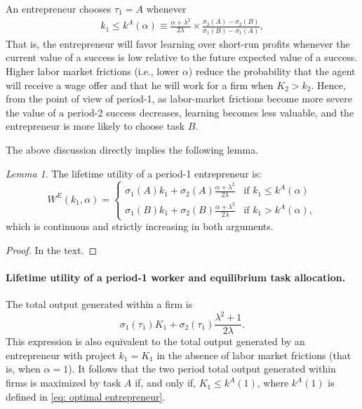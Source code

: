 \documentclass[12pt,american]{paper}
\theoremstyle{remark}
\newtheorem{lemma}{Lemma}
\begin{document}
An entrepreneur chooses $\tau_1=A$ whenever
\begin{align}\label{eq: optimal entrepreneur}
k_1\leq k^A(\alpha) \equiv   \frac{\alpha+\lambda^2}{2\lambda}\times\frac{\sigma_2(A)-\sigma_2(B)}{\sigma_1(B)-\sigma_1(A)},
\end{align}
That is, the entrepreneur will favor learning over short-run profits whenever the current value of a success is low relative to the future expected value of a success. Higher labor market frictions (i.e., lower $\alpha$) reduce the probability that the agent will receive a wage offer and that he will work for a firm when $K_2>k_2$. Hence, from the point of view of period-1, as labor-market frictions become more severe the value of a period-2 success decreases, learning becomes less valuable, and the entrepreneur is more likely to choose task $B$.  

The above discussion directly implies the following lemma.
\begin{lemma}
The lifetime utility of a period-1 entrepreneur is:
\[
W^E(k_1,\alpha)=\begin{cases}
\sigma_1(A) k_1+  \sigma_2(A)  \frac{\alpha+\lambda^2}{2\lambda} &\mbox{if } k_1\leq k^A(\alpha) \\
\sigma_1(B) k_1+  \sigma_2(B)  \frac{\alpha+\lambda^2}{2\lambda} &\mbox{if } k_1 > k^A(\alpha), 
\end{cases}
\]
which is continuous and strictly increasing in both arguments.
\end{lemma}
\begin{proof}
In the text.
\end{proof}





\paragraph{Lifetime utility of a period-1 worker and equilibrium task allocation.}

The total output generated within a firm is $$\sigma_1(\tau_1)K_1+\sigma_2(\tau_1)\frac{\lambda^2+1}{2\lambda}.$$ This expression is also equivalent to the total output generated by an entrepreneur with project $k_1=K_1$ in the absence of labor market frictions (that is, when $\alpha=1$).   It follows that the two period total output generated within firms is maximized by task $A$ if, and only if, $ K_1\leq  k^A(1)$, where $k^A(1)$ %
is defined in \eqref{eq: optimal entrepreneur}. 
\end{document}
